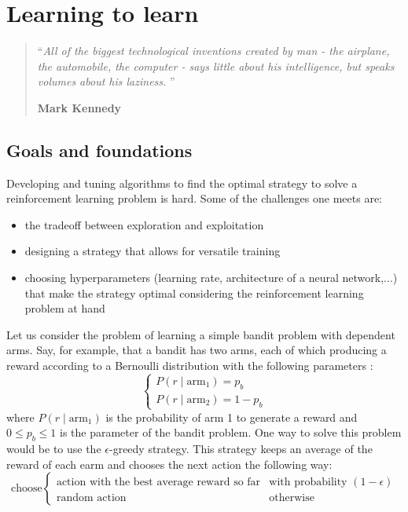 \chapter{Learning to learn}
\begin{quotation}
\noindent ``\emph{All of the biggest technological inventions created by man -
	the airplane, the automobile, the computer - says little about his 
	intelligence, but speaks volumes about his laziness.  }''
\begin{flushright}\textbf{Mark Kennedy}\end{flushright}
\end{quotation}

\vspace*{0.5cm}

\section{Goals and foundations}
Developing and tuning algorithms to find the optimal strategy to solve a
reinforcement learning problem is hard. Some of the challenges one meets are:
\begin{itemize}
	\item the tradeoff between exploration and exploitation
	\item designing a strategy that allows for versatile training
	\item choosing hyperparameters (learning rate, architecture of a
		neural network,...)  that make the strategy
		optimal considering the reinforcement learning problem at hand
\end{itemize}

Let us consider the problem of learning a simple bandit problem with dependent
arms. Say, for example, that a bandit has two arms, each of which producing
a reward according to a Bernoulli distribution with the following parameters :
$$ \begin{cases} P(r \mid \text{arm}_1) = p_b \\ 
P(r \mid \text{arm}_2) = 1 - p_b  \end{cases} $$
where $P(r \mid \text{arm}_1)$ is the probability of arm 1 to generate a reward
and $0 \leq p_b \leq 1$ is the parameter of the bandit problem. One way to
solve this problem would be to use the $\epsilon$-greedy strategy. This
strategy keeps an average of the reward of each earm and chooses the next
action the following way:
$$ \text{choose} \begin{cases}
	\text{action with the best average reward so far} & \text{with probability } (1-\epsilon) 
	\\
	\text{random action} & \text{otherwise}
\end{cases}
$$


